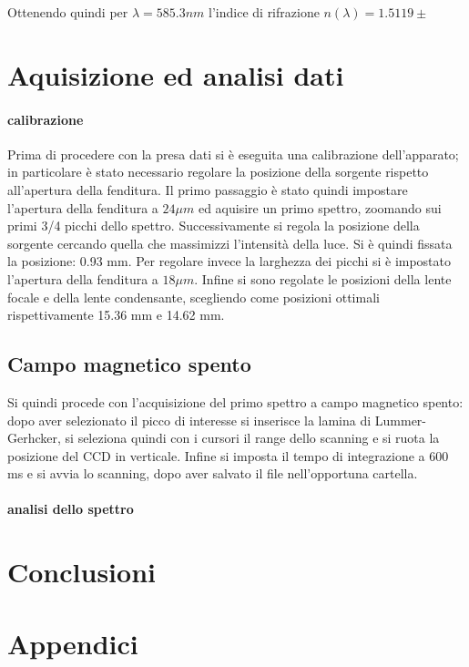 \documentclass{article}
\begin{document}
Ottenendo quindi per $\lambda= 585.3 nm$ l'indice di rifrazione $n(\lambda)= 1.5119 \pm  $

\section*{Aquisizione ed analisi dati}
\paragraph{calibrazione}
Prima di procedere con la presa dati si è eseguita una calibrazione dell'apparato; in particolare è stato necessario regolare la posizione della sorgente rispetto all'apertura della fenditura.
Il primo passaggio è stato quindi impostare l'apertura della fenditura a $24 \mu m$ ed aquisire un primo spettro, zoomando sui primi 3/4 picchi dello spettro.
Successivamente si regola la posizione della sorgente cercando quella che massimizzi l'intensità della luce.
Si è quindi fissata la posizione: 0.93 mm.
Per regolare invece la larghezza dei picchi si è impostato l'apertura della fenditura a $18 \mu m$.
Infine si sono regolate le posizioni della lente focale e della lente condensante, scegliendo come posizioni ottimali rispettivamente 15.36 mm e 14.62 mm.


\subsection*{Campo magnetico spento}

Si quindi procede con l'acquisizione del primo spettro a campo magnetico spento: dopo aver selezionato il picco di interesse si inserisce la lamina di Lummer-Gerhcker, si seleziona quindi con i cursori il range dello scanning e si ruota la posizione del CCD in verticale.
Infine si imposta il tempo di integrazione a 600 ms e si avvia lo scanning, dopo aver salvato il file nell'opportuna cartella.

\paragraph{analisi dello spettro}



\section*{Conclusioni}



\newpage
\appendix
\section{Appendici}
\label{appendice}
\end{document}
